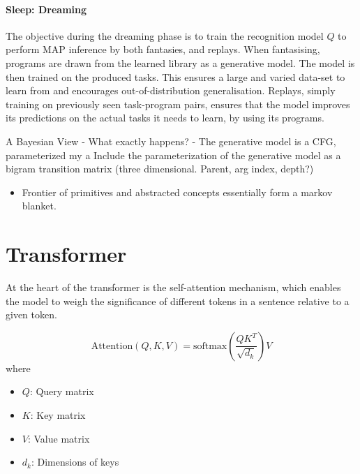\paragraph{Sleep: Dreaming} The objective during the dreaming phase is to train the recognition model $Q$ to perform MAP inference by both fantasies, and replays. When fantasising, programs are drawn from the learned library as a generative model. The model is then trained on the produced tasks. This ensures a large and varied data-set to learn from and encourages out-of-distribution generalisation. Replays, simply training on previously seen task-program pairs, ensures that the model improves its predictions on the actual tasks it needs to learn, by using its programs.

A Bayesian View
- What exactly happens?
- The generative model is a CFG, parameterized my a 
Include the parameterization of the generative model as a bigram transition matrix (three dimensional. Parent, arg index, depth?)








\begin{itemize}
    \item Frontier of primitives and abstracted concepts essentially form a markov blanket. 
\end{itemize}

\section{Transformer}

At the heart of the transformer is the self-attention mechanism, which enables the model to weigh the significance of different tokens in a sentence relative to a given token.

$$ \text{Attention}(Q, K, V) = \text{softmax}(\frac{QK^T}{\sqrt{d_k}})V $$
where
\begin{itemize}
    \item $Q$: Query matrix
    \item $K$: Key matrix 
    \item $V$: Value matrix
    \item $d_k$: Dimensions of keys
\end{itemize}

